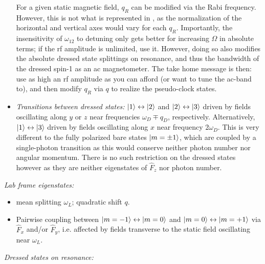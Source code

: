 \documentclass[aps,prl,reprint,superscriptaddress,floatfix]{revtex4-1}
\begin{document}
\begin{itemize}
    For a given static magnetic field, $q_R$ can be modified via the Rabi frequency.
    However, this is not what is represented in , as the normalization of the horizontal and vertical axes would vary for each $q_R$.
    Importantly, the insensitivity of $\omega_{12}$ to detuning only gets better for increasing $\Omega$ in absolute terms; if the rf amplitude is unlimited, use it.
    However, doing so also modifies the absolute dressed state splittings on resonance, and thus the bandwidth of the dressed spin-1 as an ac magnetometer.
    The take home message is then: use as high an rf amplitude as you can afford (or want to tune the ac-band to), and then modify $q_R$ via $q$ to realize the pseudo-clock states.
    \item \textit{Transitions between dressed states:} $\vert 1 \rangle  \leftrightarrow \vert 2 \rangle $ and $\vert 2 \rangle  \leftrightarrow \vert 3 \rangle $ driven by fields oscillating along $y$ or $z$ near frequencies $\omega_D \mp q_D$, respectively.
    Alternatively, $\vert 1 \rangle  \leftrightarrow \vert 3 \rangle $ driven by fields oscillating along $x$ near frequency $2\omega_D$.
    This is very different to the fully polarized bare states $\vert m=\pm 1 \rangle $, which are coupled by a single-photon transition as this would conserve neither photon number nor angular momentum.
    There is no such restriction on the dressed states however as they are neither eigenstates of $\hat{F}_z$ nor photon number. 
\end{itemize}
\textit{Lab frame eigenstates:}
\begin{itemize}
    \item mean splitting $\omega_L$; quadratic shift $q$.
    \item Pairwise coupling between $\vert m=-1 \rangle  \leftrightarrow \vert m=0 \rangle $ and $\vert m=0 \rangle  \leftrightarrow \vert m=+1 \rangle $ via $\hat{F}_x$ and/or $\hat{F}_y$, i.e. affected by fields transverse to the static field oscillating near $\omega_L$.
\end{itemize}
\textit{Dressed states on resonance:}
\end{document}

